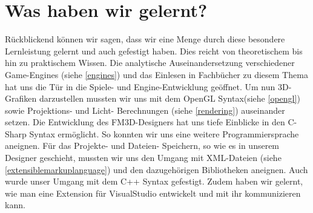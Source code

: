 \section{Was haben wir gelernt?}
Rückblickend können wir sagen, dass wir eine Menge durch diese besondere Lernleistung gelernt und auch gefestigt haben. Dies reicht von theoretischem bis hin zu praktischem Wissen. 
Die analytische Auseinandersetzung verschiedener Game-Engines (siehe \cref{engines}) und das Einlesen in Fachbücher zu diesem Thema hat uns die Tür in die Spiele- und Engine-Entwicklung geöffnet. Um nun 3D-Grafiken darzustellen mussten wir uns mit dem OpenGL Syntax(siehe \cref{opengl}) sowie Projektions- und Licht- Berechnungen (siehe \cref{rendering}) auseinander setzen.
Die Entwicklung des FM3D-Designers hat uns tiefe Einblicke in den C-Sharp Syntax ermöglicht. So konnten wir uns eine weitere Programmiersprache aneignen. Für das Projekte- und Dateien- Speichern, so wie es in unserem Designer geschieht, mussten wir uns den Umgang mit XML-Dateien (siehe \cref{extensiblemarkuplanguage}) und den dazugehörigen Bibliotheken aneignen.  Auch wurde unser Umgang mit dem C++ Syntax gefestigt. Zudem haben wir gelernt, wie man eine Extension für VisualStudio entwickelt und mit ihr kommunizieren kann.